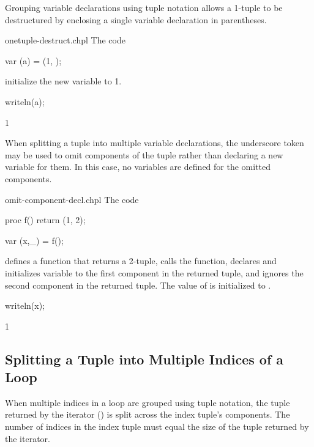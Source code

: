 Grouping variable declarations using tuple notation allows a 1-tuple
to be destructured by enclosing a single variable declaration in
parentheses.
\begin{chapelexample}{onetuple-destruct.chpl}
The code
\begin{chapel}
var (a) = (1, );
\end{chapel}
initialize the new variable  to 1.
\begin{chapelpost}
writeln(a);
\end{chapelpost}
\begin{chapeloutput}
1
\end{chapeloutput}
\end{chapelexample}

When splitting a tuple into multiple variable declarations, the
underscore token may be used to omit components of the tuple rather
than declaring a new variable for them.  In this case, no variables
are defined for the omitted components.

\begin{chapelexample}{omit-component-decl.chpl}
The code
\begin{chapel}
proc f()
  return (1, 2);

var (x,_) = f();
\end{chapel}
defines a function that returns a 2-tuple, calls the function,
declares and initializes variable  to the first component in
the returned tuple, and ignores the second component in the returned
tuple.  The value of  is initialized to .
\begin{chapelpost}
writeln(x);
\end{chapelpost}
\begin{chapeloutput}
1
\end{chapeloutput}
\end{chapelexample}

\subsection{Splitting a Tuple into Multiple Indices of a Loop}
\label{Indices_in_a_Tuple}

When multiple indices in a loop are grouped using tuple notation, the tuple
returned by the iterator () is split across the index tuple's components.  The
number of indices in the index tuple must equal the size of the tuple
returned by the iterator.

